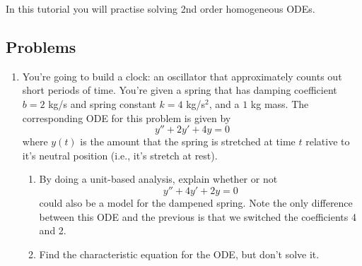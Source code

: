 \begin{objectives}
	In this tutorial you will practise solving 2nd order homogeneous ODEs.
\end{objectives}

\vspace{-.5em}
\subsection*{Problems}
\vspace{-.5em}






\begin{enumerate}


    \item You're going to build a clock: an oscillator that approximately counts out short periods of time.
    You're given a spring that has damping coefficient $b=2$ kg/s and spring constant $k=4$ kg/s$^2$, and a $1$ kg mass. The corresponding ODE for this problem is given by
    \[
        y'' + 2y' + 4y = 0
    \]
    where $y(t)$ is the amount that the spring is stretched  at time $t$ relative to it's neutral position (i.e., it's stretch at rest).

    \begin{enumerate}
        \item By doing a unit-based analysis, explain whether or not 
        \[
            y'' + 4y' + 2y = 0
        \]
        could also be a model for the dampened spring. Note the only difference between this ODE and the previous is that we switched the coefficients 4 and 2.

        \item Find the characteristic equation for the ODE, but don't solve it.


\end{enumerate}
\end{enumerate}
